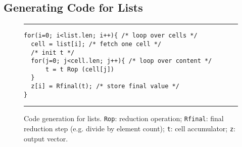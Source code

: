 \subsection{Generating Code for Lists}


\begin{figure}[htbp]
\par\noindent\rule{\columnwidth}{0.6pt}
\begin{small}
\begin{verbatim} 
for(i=0; i<list.len; i++){ /* loop over cells */
  cell = list[i]; /* fetch one cell */
  /* init t */
  for(j=0; j<cell.len; j++){ /* loop over content */
      t = t Rop (cell[j])
  }
  z[i] = Rfinal(t); /* store final value */
}
\end{verbatim}
\end{small}
\par\noindent\rule{\columnwidth}{0.6pt}
\caption{Code generation for lists. \texttt{Rop}: reduction operation; \texttt{Rfinal}: final reduction step (e.g. divide by element count); \texttt{t}: cell accumulator; \texttt{z}: output vector.} \label{fig:codegen_lists}
\end{figure}


